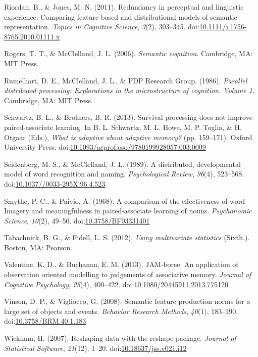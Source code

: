 \documentclass[english,man]{apa6}
\theoremstyle{definition}
\theoremstyle{definition}
\theoremstyle{definition}
\theoremstyle{remark}
\begin{document}
\hypertarget{ref-Riordan2011}{}
Riordan, B., \& Jones, M. N. (2011). Redundancy in perceptual and
linguistic experience: Comparing feature-based and distributional models
of semantic representation. \emph{Topics in Cognitive Science},
\emph{3}(2), 303--345.
doi:\href{https://doi.org/10.1111/j.1756-8765.2010.01111.x}{10.1111/j.1756-8765.2010.01111.x}

\hypertarget{ref-Rogers2006}{}
Rogers, T. T., \& McClelland, J. L. (2006). \emph{Semantic cognition}.
Cambridge, MA: MIT Press.

\hypertarget{ref-Rumelhart1986}{}
Rumelhart, D. E., McClelland, J. L., \& PDP Research Group. (1986).
\emph{Parallel distributed processing: Explorations in the
microstructure of cognition. Volume 1}. Cambridge, MA: MIT Press.

\hypertarget{ref-Schwartz2013}{}
Schwartz, B. L., \& Brothers, B. R. (2013). Survival processing does not
improve paired-associate learning. In B. L. Schwartz, M. L. Howe, M. P.
Toglia, \& H. Otgaar (Eds.), \emph{What is adaptive about adaptive
memory?} (pp. 159--171). Oxford University Press.
doi:\href{https://doi.org/10.1093/acprof:oso/9780199928057.003.0009}{10.1093/acprof:oso/9780199928057.003.0009}

\hypertarget{ref-Seidenberg1989a}{}
Seidenberg, M. S., \& McClelland, J. L. (1989). A distributed,
developmental model of word recognition and naming. \emph{Psychological
Review}, \emph{96}(4), 523--568.
doi:\href{https://doi.org/10.1037//0033-295X.96.4.523}{10.1037//0033-295X.96.4.523}

\hypertarget{ref-Smythe1968}{}
Smythe, P. C., \& Paivio, A. (1968). A comparison of the effectiveness
of word Imagery and meaningfulness in paired-associate learning of
nouns. \emph{Psychonomic Science}, \emph{10}(2), 49--50.
doi:\href{https://doi.org/10.3758/BF03331401}{10.3758/BF03331401}

\hypertarget{ref-Tabachnick2012}{}
Tabachnick, B. G., \& Fidell, L. S. (2012). \emph{Using multivariate
statistics} (Sixth.). Boston, MA: Pearson.

\hypertarget{ref-Valentine2013}{}
Valentine, K. D., \& Buchanan, E. M. (2013). JAM-boree: An application
of observation oriented modelling to judgements of associative memory.
\emph{Journal of Cognitive Psychology}, \emph{25}(4), 400--422.
doi:\href{https://doi.org/10.1080/20445911.2013.775120}{10.1080/20445911.2013.775120}

\hypertarget{ref-Vinson2008}{}
Vinson, D. P., \& Vigliocco, G. (2008). Semantic feature production
norms for a large set of objects and events. \emph{Behavior Research
Methods}, \emph{40}(1), 183--190.
doi:\href{https://doi.org/10.3758/BRM.40.1.183}{10.3758/BRM.40.1.183}

\hypertarget{ref-Wickham2007}{}
Wickham, H. (2007). Reshaping data with the reshape package.
\emph{Journal of Statistical Software}, \emph{21}(12), 1--20.
doi:\href{https://doi.org/10.18637/jss.v021.i12}{10.18637/jss.v021.i12}
\end{document}
